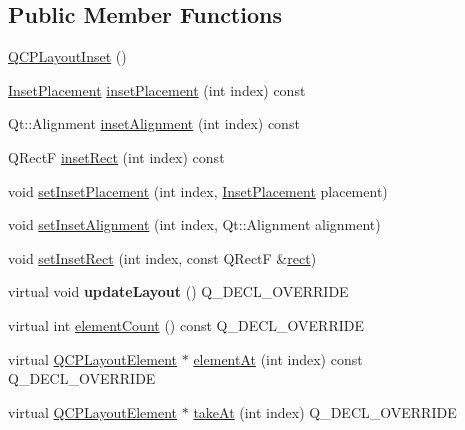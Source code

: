 \subsection*{Public Member Functions}
\begin{DoxyCompactItemize}
\item 
\mbox{\hyperlink{class_q_c_p_layout_inset_a3ad984f3221735374cc5dee14356a7dd}{Q\+C\+P\+Layout\+Inset}} ()
\item 
\mbox{\hyperlink{class_q_c_p_layout_inset_a8b9e17d9a2768293d2a7d72f5e298192}{Inset\+Placement}} \mbox{\hyperlink{class_q_c_p_layout_inset_a6fcbd74ebbc45bfe64c604b2791aa57f}{inset\+Placement}} (int index) const
\item 
Qt\+::\+Alignment \mbox{\hyperlink{class_q_c_p_layout_inset_a5b33b66f0abbb4a7cc2f8aa6c94cf7f8}{inset\+Alignment}} (int index) const
\item 
Q\+RectF \mbox{\hyperlink{class_q_c_p_layout_inset_ab23099a46af17c31f4c40668f13c9de1}{inset\+Rect}} (int index) const
\item 
void \mbox{\hyperlink{class_q_c_p_layout_inset_a63298830744d5d8c5345511c00fd2144}{set\+Inset\+Placement}} (int index, \mbox{\hyperlink{class_q_c_p_layout_inset_a8b9e17d9a2768293d2a7d72f5e298192}{Inset\+Placement}} placement)
\item 
void \mbox{\hyperlink{class_q_c_p_layout_inset_a62882a4f9ad58bb0f53da12fde022abe}{set\+Inset\+Alignment}} (int index, Qt\+::\+Alignment alignment)
\item 
void \mbox{\hyperlink{class_q_c_p_layout_inset_aa487c8378a6f9533567a2e6430099dc3}{set\+Inset\+Rect}} (int index, const Q\+RectF \&\mbox{\hyperlink{class_q_c_p_layout_element_a208effccfe2cca4a0eaf9393e60f2dd4}{rect}})
\item 
\mbox{\label{class_q_c_p_layout_inset_a493526b922ea66a75c45ef1842446988}} 
virtual void {\bfseries update\+Layout} () Q\+\_\+\+D\+E\+C\+L\+\_\+\+O\+V\+E\+R\+R\+I\+DE
\item 
virtual int \mbox{\hyperlink{class_q_c_p_layout_inset_a7f5aa4d48a2e844cfe6dd7ed8f0861df}{element\+Count}} () const Q\+\_\+\+D\+E\+C\+L\+\_\+\+O\+V\+E\+R\+R\+I\+DE
\item 
virtual \mbox{\hyperlink{class_q_c_p_layout_element}{Q\+C\+P\+Layout\+Element}} $\ast$ \mbox{\hyperlink{class_q_c_p_layout_inset_a881ca205605bae9c034733b808f93a02}{element\+At}} (int index) const Q\+\_\+\+D\+E\+C\+L\+\_\+\+O\+V\+E\+R\+R\+I\+DE
\item 
virtual \mbox{\hyperlink{class_q_c_p_layout_element}{Q\+C\+P\+Layout\+Element}} $\ast$ \mbox{\hyperlink{class_q_c_p_layout_inset_abf2e8233f5b7051220907e62ded490a2}{take\+At}} (int index) Q\+\_\+\+D\+E\+C\+L\+\_\+\+O\+V\+E\+R\+R\+I\+DE

\end{DoxyCompactItemize}
